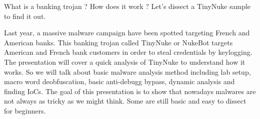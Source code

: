 \def\abstracttitle{Malware Dissection 101 : TinyNuke}
\def\abstractcomment{Short Talk}
\def\abstractowner{Nha-Khanh Nguyen}

\thispagestyle{abstract}

What is a banking trojan ? How does it work ? Let's dissect a TinyNuke sample to find it out.

Last year, a massive malware campaign have been spotted targeting French and American banks.
This banking trojan called TinyNuke or NukeBot targets American and French bank customers in order to steal credentials by keylogging. The presentation will cover a quick analysis of TinyNuke to understand how it works. So we will talk about basic malware analysis method including lab setup, macro word deobfuscation, basic anti-debugg bypass, dynamic analysis and finding IoCs. The goal of this presentation is to show that nowadays malwares are not always as tricky as we might think. Some are still basic and easy to dissect for beginners.
